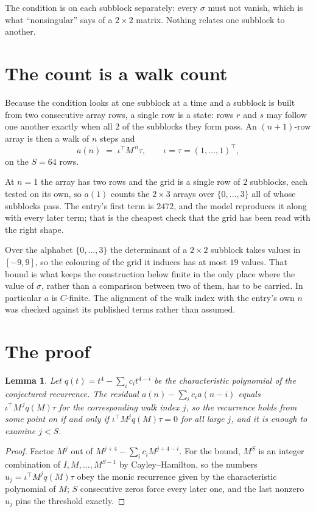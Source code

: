 \documentclass[11pt,a4paper]{article}
\theoremstyle{plain}
\newtheorem{lemma}[theorem]{Lemma}
\theoremstyle{definition}
\begin{document}
The condition is on each subblock separately: every $\sigma$ must not vanish, which is what
``nonsingular'' says of a $2\times2$ matrix. Nothing
relates one subblock to another.

\section{The count is a walk count}

Because the condition looks at one subblock at a time and a subblock is
built from two consecutive array rows, a single row is a state: rows $r$ and $s$ may follow one
another exactly when all $2$ of the subblocks they form pass. An $(n+1)$-row array is then a
walk of $n$ steps and
\[
a(n)\;=\;\iota^{\!\top}M^{\,n}\tau,\qquad\iota=\tau=(1,\dots,1)^{\!\top},
\]
on the $S=64$ rows.

At $n=1$ the array has two rows and the grid is a single row of $2$
subblocks, each tested on its own, so $a(1)$ counts the
$2\times3$ arrays over $\{0,\dots,3\}$ all of whose subblocks pass. The entry's
first term is $2472$, and the model reproduces it along with every later term; that is the
cheapest check that the grid has been read with the right shape.

Over the alphabet $\{0,\dots,3\}$ the determinant of a $2\times2$ subblock takes values in
$[-9,9]$, so the colouring of the grid it induces has at most $19$ values.
That bound is what keeps the construction below finite in the only place where the value of
$\sigma$, rather than a comparison between two of them, has to be carried.
In particular $a$ is $C$-finite. The alignment of the walk index with the entry's own $n$ was
checked against its published terms rather than assumed.

\section{The proof}

\begin{lemma}\label{lem:crit}
Let $q(t)=t^{4}-\sum_i c_it^{4-i}$ be the characteristic polynomial of the
conjectured recurrence. The residual $a(n)-\sum_ic_ia(n-i)$ equals
$\iota^{\!\top}M^{\,j}q(M)\tau$ for the corresponding walk index $j$, so the recurrence
holds from some point on if and only if $\iota^{\!\top}M^{j}q(M)\tau=0$ for all large $j$,
and it is enough to examine $j<S$.
\end{lemma}

\begin{proof}
Factor $M^{j}$ out of $M^{j+4}-\sum_ic_iM^{j+4-i}$. For the bound, $M^{S}$
is an integer combination of $I,M,\dots,M^{S-1}$ by Cayley--Hamilton, so the numbers
$u_j=\iota^{\!\top}M^{j}q(M)\tau$ obey the monic recurrence given by the characteristic
polynomial of $M$; $S$ consecutive zeros force every later one, and the last nonzero $u_j$
pins the threshold exactly.
\end{proof}
\end{document}
